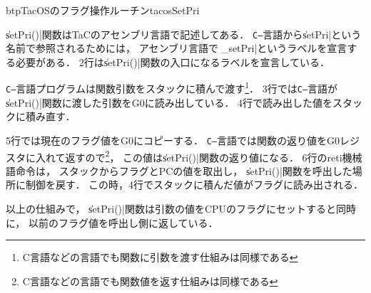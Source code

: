 \begin{myfig}{btp}{TacOSのフラグ操作ルーチン}{tacosSetPri}

\end{myfig}

\|setPri()|関数はTaCのアセンブリ言語で記述してある．
{\tt C--}言語から\|setPri|という名前で参照されるためには，
アセンブリ言語では\|_setPri|というラベルを宣言する必要がある．
2行は\|setPri()|関数の入口になるラベルを宣言している．

{\tt C--}言語プログラムは関数引数をスタックに積んで渡す\footnote{
C言語などの言語でも関数に引数を渡す仕組みは同様である}．
3行では{\tt C--}言語が\|setPri()|関数に渡した引数をG0に読み出している．
4行で読み出した値をスタックに積み直す．

5行では現在のフラグ値をG0にコピーする．
{\tt C--}言語では関数の返り値をG0レジスタに入れて返すので\footnote{
C言語などの言語でも関数値を返す仕組みは同様である}，
この値は\|setPri()|関数の返り値になる．
6行のreti機械語命令は，
スタックからフラグとPCの値を取出し，
\|setPri()|関数を呼出した場所に制御を戻す．
この時，4行でスタックに積んだ値がフラグに読み出される．

以上の仕組みで，
\|setPri()|関数は引数の値をCPUのフラグにセットすると同時に，
以前のフラグ値を呼出し側に返している．
